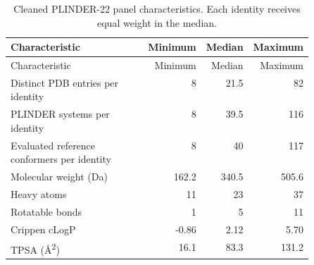 \begingroup
\setlength{\tabcolsep}{3pt}
\renewcommand{\arraystretch}{1.15}
\footnotesize
\begin{longtable}{@{}p{0.50\linewidth}rrr@{}}
\caption{Cleaned PLINDER-22 panel characteristics. Each identity receives equal weight in the median.}\label{tab:plinder23-statistics}\\
\toprule
Characteristic & Minimum & Median & Maximum\\
\midrule
\endfirsthead
\toprule
Characteristic & Minimum & Median & Maximum\\
\midrule
\endhead
\bottomrule
\endfoot
Distinct PDB entries per identity & 8 & 21.5 & 82\\
PLINDER systems per identity & 8 & 39.5 & 116\\
Evaluated reference conformers per identity & 8 & 40 & 117\\
Molecular weight (Da) & 162.2 & 340.5 & 505.6\\
Heavy atoms & 11 & 23 & 37\\
Rotatable bonds & 1 & 5 & 11\\
Crippen cLogP & -0.86 & 2.12 & 5.70\\
TPSA (\AA{}\textsuperscript{2}) & 16.1 & 83.3 & 131.2\\
\end{longtable}
\endgroup
